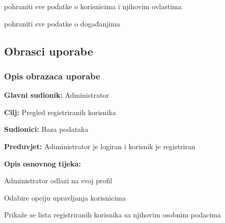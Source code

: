 \begin{packed_enum}
\begin{packed_enum}
			\end{packed_enum}
			
			
			\item  {}
			
			\begin{packed_enum}
				
				\item pohraniti sve podatke o korisnicima i njihovim ovlastima
				\item pohraniti sve podatke o događanjima
				
				
			\end{packed_enum}
			
		\end{packed_enum}
		
		\eject 
			
			
				
			\subsection{Obrasci uporabe}
				
				
				\subsubsection{Opis obrazaca uporabe}
				
				\noindent {}
				\begin{packed_item}
					
					\item \textbf{Glavni sudionik: }Administrator
					\item  \textbf{Cilj:} Pregled registriranih korisnika
					\item  \textbf{Sudionici:} Baza podataka
					\item  \textbf{Preduvjet:} Adiministrator je logiran i korisnik je registriran
					\item  \textbf{Opis osnovnog tijeka:}
					
					\item[] \begin{packed_enum}
						\item Administrator odlazi na svoj profil 
						\item Odabire opciju upravljanja korisnicima
						\item Prikaže se lista registriranih korisnika sa njihovim osobnim podacima
					\end{packed_enum}
					
				\end{packed_item}
				
